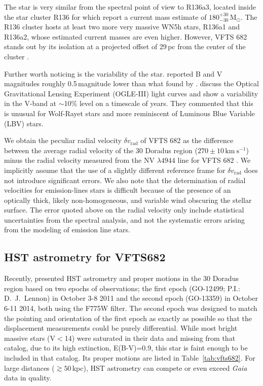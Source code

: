 \documentclass[apjl,twocolumn]{emulateapj}
\newcommand{\kms}{{\,\mathrm{km\ s^{-1}}}}
\newcommand{\Msun}{{\,\mathrm{M}_\odot}}
\DeclareRobustCommand{\Tabref}[1]{Table~\ref{#1}}
\begin{document}
The star is very similar from the spectral point of view to R136a3, located inside the star cluster
R136 \citep{crowther:10}  for which \citet{crowther:16} report a
current mass estimate of $180^{+30}_{-30}\Msun$. The R136 cluster hosts
at least two more very massive WN5h stars, R136a1 and R136a2, whose
estimated current masses are even higher. However, VFTS 682 stands
out by its isolation at a projected offset of 29\,pc from the center
of the cluster \citep{bestenlehner:11}. 

Further worth noticing is the variability of the
star. \citet{parker:93} reported B and V magnitudes roughly 0.5\,magnitude
lower than what found by \citet{evans:11}. \citet{bestenlehner:11} discuss the Optical Gravitational Lensing
Experiment (OGLE-III) light curves \citep{udalski:08} and show a
variability in the V-band at $\sim$10\% level on a timescale of years.
They commented that this is unusual for Wolf-Rayet stars and more reminiscent
of Luminous Blue Variable (LBV) stars. 

We obtain the peculiar radial velocity $\delta v_\mathrm{rad}$ of VFTS 682 as the difference
between the average radial velocity of the 30 Doradus region
($270\pm10\kms$) minus the radial velocity measured from the NV $\lambda4944$
line for VFTS 682  \citep[$300\pm10\kms$, ][]{bestenlehner:11}. We implicitly assume that the use
of a slightly different reference frame for $\delta v_\mathrm{rad}$ does not
introduce significant errors. We also note that the determination of
radial velocities for emission-lines stars is difficult because of the
presence of an optically thick, likely non-homogeneous, and variable
wind obscuring the stellar surface. The error quoted above on the
radial velocity only include statistical uncertainties from the
spectral analysis, and not the systematic errors arising from the
modeling of emission line stars.


\subsection{HST astrometry for VFTS682}
Recently, \citet{platais:18} presented HST  astrometry and proper
motions in the 30 Doradus region based on two epochs of
observations; the first epoch (GO-12499; P.I.: D.~J.~Lennon)
in October 3-8 2011 and the second epoch (GO-13359) in
October 6-11 2014, both using the F775W filter.
The second epoch was designed to match the pointing and
orientation of the first epoch as exactly as possible so
that the displacement measurements could be purely differential.
While most bright massive stars (V$<$14) were saturated in
their data and missing from that catalog, due to its
high extinction, E(B-V)=0.9, this star is faint enough
to be included in that catalog. Its proper motions are
listed in \Tabref{tab:vfts682}. For
large distances ($\gtrsim50$\,kpc), HST astrometry can compete or even
exceed \emph{Gaia} data in quality.
\end{document}
